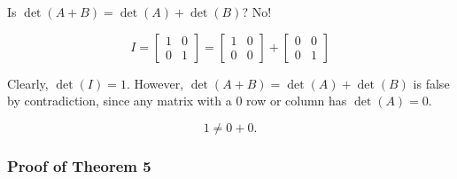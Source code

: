 \documentclass[12pt]{article}
\begin{document}
Is $\det(A+B) = \det(A) + \det(B)$? No!

\[
  I = \begin{bmatrix}
    1 & 0\\
    0 & 1
  \end{bmatrix}
  = \begin{bmatrix}
    1 & 0 \\
    0 & 0
  \end{bmatrix}
  + \begin{bmatrix}
    0 & 0 \\
    0 & 1
  \end{bmatrix}
\]

Clearly, $\det(I) = 1$. However, $\det(A+B) = \det(A) + \det(B)$ is false by
contradiction, since any matrix with a $0$ row or column has $\det(A) = 0$.

\[
 1 \neq 0 + 0
.\]

\subsubsection*{Proof of Theorem 5}
\end{document}
